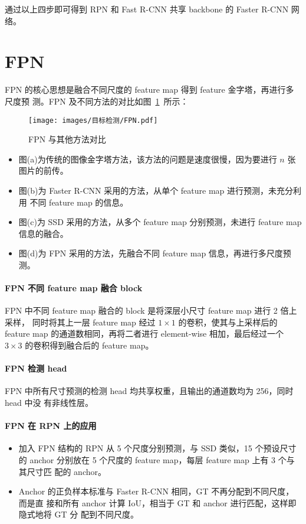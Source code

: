 通过以上四步即可得到 RPN 和 Fast R-CNN 共享 backbone 的 Faster R-CNN 网络。

\section{FPN}
\label{sec:FPN}

FPN 的核心思想是融合不同尺度的 feature map 得到 feature 金字塔，再进行多尺度预
测。FPN 及不同方法的对比如图~\ref{fig:FPN}~所示：

\begin{figure}[ht]
  \centering
  \texttt{[image: images/目标检测/FPN.pdf]}
  \caption{FPN 与其他方法对比}
  \label{fig:FPN}
\end{figure}

\begin{itemize}
  \item 图(a)为传统的图像金字塔方法，该方法的问题是速度很慢，因为要进行 $n$ 张
    图片的前传。
  \item 图(b)为 Faster R-CNN 采用的方法，从单个 feature map 进行预测，未充分利用
    不同 feature map 的信息。
  \item 图(c)为 SSD 采用的方法，从多个 feature map 分别预测，未进行 feature map 信息的融合。
  \item 图(d)为 FPN 采用的方法，先融合不同 feature map 信息，再进行多尺度预测。
\end{itemize}

\paragraph{FPN 不同 feature map 融合 block}
FPN 中不同 feature map 融合的 block 是将深层小尺寸 feature map 进行 2 倍上采样，
同时将其上一层 feature map 经过 $1 \times 1$ 的卷积，使其与上采样后的 feature
map 的通道数相同，再将二者进行 element-wise 相加，最后经过一个 $3 \times 3$
的卷积得到融合后的 feature map。

\paragraph{FPN 检测 head}
FPN 中所有尺寸预测的检测 head 均共享权重，且输出的通道数均为 256，同时 head 中没
有非线性层。

\paragraph{FPN 在 RPN 上的应用}

\begin{itemize}
  \item 加入 FPN 结构的 RPN 从 5 个尺度分别预测，与 SSD 类似，15 个预设尺寸的
    anchor 分别放在 5 个尺度的 feature map，每层 feature map 上有 3 个与其尺寸匹
    配的 anchor。
  \item Anchor 的正负样本标准与 Faster R-CNN 相同，GT 不再分配到不同尺度，而是直
    接和所有 anchor 计算 IoU，相当于 GT 和 anchor 进行匹配，这样即隐式地将 GT 分
    配到不同尺度。
\end{itemize}

